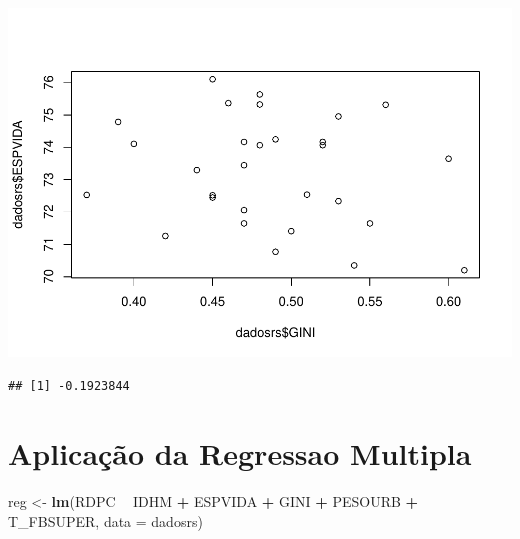 \documentclass[]{article}
\newenvironment{Shaded}{\begin{snugshade}}{\end{snugshade}}
\newcommand{\KeywordTok}[1]{\textcolor[rgb]{0.13,0.29,0.53}{\textbf{#1}}}
\newcommand{\DataTypeTok}[1]{\textcolor[rgb]{0.13,0.29,0.53}{#1}}
\newcommand{\StringTok}[1]{\textcolor[rgb]{0.31,0.60,0.02}{#1}}
\newcommand{\OperatorTok}[1]{\textcolor[rgb]{0.81,0.36,0.00}{\textbf{#1}}}
\newcommand{\NormalTok}[1]{#1}
\begin{document}
\begin{Shaded}
\end{Shaded}

\includegraphics{AnaliseRegressaoRendaPerCaptaRS_files/figure-latex/correlacao_plot-1.pdf}

\begin{Shaded}
\end{Shaded}

\begin{verbatim}
## [1] -0.1923844
\end{verbatim}

\section{Aplicação da Regressao
Multipla}\label{aplicacao-da-regressao-multipla}

\begin{Shaded}
\begin{Highlighting}[]
\NormalTok{reg <-}\StringTok{ }\KeywordTok{lm}\NormalTok{(RDPC }\OperatorTok{~}\StringTok{ }\NormalTok{IDHM }\OperatorTok{+}\StringTok{ }\NormalTok{ESPVIDA }\OperatorTok{+}\StringTok{ }\NormalTok{GINI }\OperatorTok{+}\StringTok{ }\NormalTok{PESOURB }\OperatorTok{+}\StringTok{ }\NormalTok{T_FBSUPER, }\DataTypeTok{data =}\NormalTok{ dadosrs)}
\end{Highlighting}
\end{Shaded}
\end{document}
